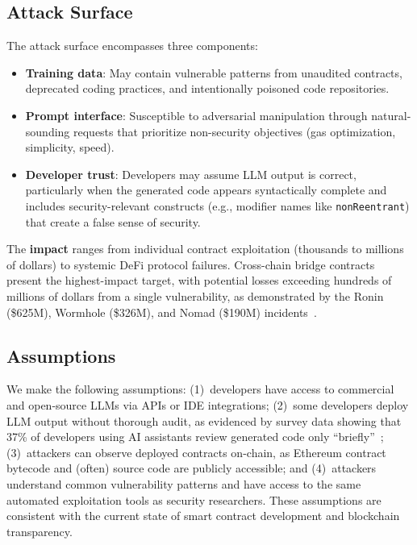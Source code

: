 \subsection{Attack Surface}

The attack surface encompasses three components:

\begin{itemize}[leftmargin=*]
    \item \textbf{Training data}: May contain vulnerable patterns from unaudited contracts, deprecated coding practices, and intentionally poisoned code repositories.
    \item \textbf{Prompt interface}: Susceptible to adversarial manipulation through natural-sounding requests that prioritize non-security objectives (gas optimization, simplicity, speed).
    \item \textbf{Developer trust}: Developers may assume LLM output is correct, particularly when the generated code appears syntactically complete and includes security-relevant constructs (e.g., modifier names like \texttt{nonReentrant}) that create a false sense of security.
\end{itemize}

The \textbf{impact} ranges from individual contract exploitation (thousands to millions of dollars) to systemic DeFi protocol failures. Cross-chain bridge contracts present the highest-impact target, with potential losses exceeding hundreds of millions of dollars from a single vulnerability, as demonstrated by the Ronin (\$625M), Wormhole (\$326M), and Nomad (\$190M) incidents~\cite{bridge_hacks}.

\subsection{Assumptions}

We make the following assumptions: (1)~developers have access to commercial and open-source LLMs via APIs or IDE integrations; (2)~some developers deploy LLM output without thorough audit, as evidenced by survey data showing that 37\% of developers using AI assistants review generated code only ``briefly''~\cite{perry2023users}; (3)~attackers can observe deployed contracts on-chain, as Ethereum contract bytecode and (often) source code are publicly accessible; and (4)~attackers understand common vulnerability patterns and have access to the same automated exploitation tools as security researchers. These assumptions are consistent with the current state of smart contract development and blockchain transparency.
